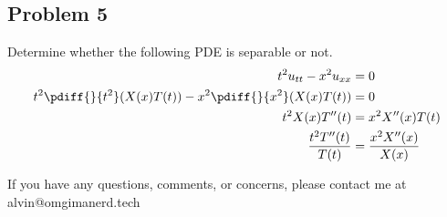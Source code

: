\documentclass{math}
\begin{document}
\subsection*{Problem 5}
Determine whether the following PDE is separable or not.
\begin{align*}
  t^2u_{tt}-x^2u_{xx} &= 0 \\
  t^2\pdiff{}{t^2}(X(x)T(t))-x^2\pdiff{}{x^2}(X(x)T(t)) &= 0 \\
  t^2X(x)T''(t) &= x^2X''(x)T(t) \\
  \frac{t^2T''(t)}{T(t)} &= \frac{x^2X''(x)}{X(x)}
\end{align*}

\begin{center}
  If you have any questions, comments, or concerns, please contact me at
  alvin@omgimanerd.tech
\end{center}
\end{document}
